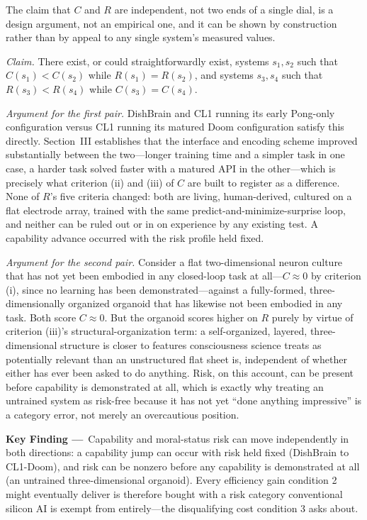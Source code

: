 \documentclass[journal]{IEEEtran}
\begin{document}
The claim that $C$ and $R$ are independent, not two ends of a single dial, is a
design argument, not an empirical one, and it can be shown by construction rather
than by appeal to any single system's measured values.

\emph{Claim.} There exist, or could straightforwardly exist, systems $s_1, s_2$ such
that $C(s_1) < C(s_2)$ while $R(s_1) = R(s_2)$, and systems $s_3, s_4$ such that
$R(s_3) < R(s_4)$ while $C(s_3) = C(s_4)$.

\emph{Argument for the first pair.} DishBrain and CL1 running its early Pong-only
configuration versus CL1 running its matured Doom configuration satisfy this
directly. Section~III establishes that the interface and encoding scheme improved
substantially between the two---longer training time and a simpler task in one case,
a harder task solved faster with a matured API in the other---which is precisely what
criterion (ii) and (iii) of $C$ are built to register as a difference. None of
$R$'s five criteria changed: both are living, human-derived, cultured on a flat
electrode array, trained with the same predict-and-minimize-surprise loop, and
neither can be ruled out or in on experience by any existing test. A capability
advance occurred with the risk profile held fixed.

\emph{Argument for the second pair.} Consider a flat two-dimensional neuron culture
that has not yet been embodied in any closed-loop task at all---$C \approx 0$ by
criterion (i), since no learning has been demonstrated---against a fully-formed,
three-dimensionally organized organoid that has likewise not been embodied in any
task. Both score $C \approx 0$. But the organoid scores higher on $R$ purely by
virtue of criterion (iii)'s structural-organization term: a self-organized,
layered, three-dimensional structure is closer to features consciousness science
treats as potentially relevant than an unstructured flat sheet is, independent of
whether either has ever been asked to do anything. Risk, on this account, can be
present before capability is demonstrated at all, which is exactly why treating an
untrained system as risk-free because it has not yet ``done anything impressive'' is
a category error, not merely an overcautious position.

\begin{mdframed}[
  linecolor=deepred, linewidth=1.4pt,
  backgroundcolor=deepred!5,
  innerleftmargin=8pt, innerrightmargin=8pt,
  innertopmargin=6pt, innerbottommargin=6pt,
  roundcorner=4pt
]
\noindent\textbf{\textcolor{deepred}{Key Finding ---}}~Capability and moral-status
risk can move independently in both directions: a capability jump can occur with
risk held fixed (DishBrain to CL1-Doom), and risk can be nonzero before any
capability is demonstrated at all (an untrained three-dimensional organoid). Every
efficiency gain condition 2 might eventually deliver is therefore bought with a risk
category conventional silicon AI is exempt from entirely---the disqualifying cost
condition 3 asks about.
\end{mdframed}
\end{document}
